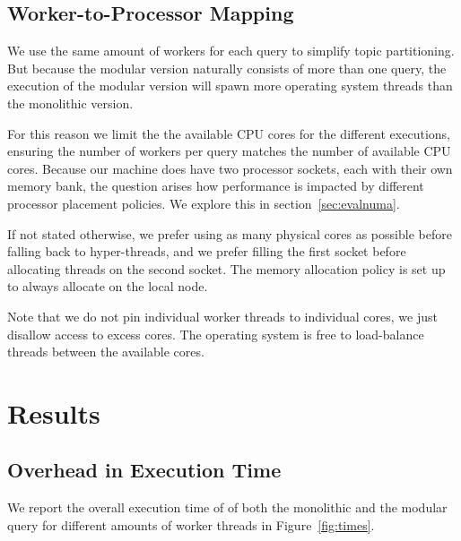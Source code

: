 \subsection{Worker-to-Processor Mapping}

We use the same amount of workers for each query to simplify topic partitioning.
But because the modular version naturally consists of more than one query,
the execution of the modular version will spawn more operating system threads
than the monolithic version.

For this reason we limit the the available CPU cores for the different executions,
ensuring the number of workers per query matches the number of available CPU cores.
Because our machine does have two processor sockets, each with their own memory bank,
the question arises how performance is impacted by different processor placement
policies. We explore this in section~\ref{sec:evalnuma}.

If not stated otherwise, we prefer using as many physical cores 
as possible before falling back to hyper-threads, and we prefer filling the
first socket before allocating threads on the second socket. The memory
allocation policy is set up to always allocate on the local node.

Note that we do not pin individual worker threads to individual cores, we just
disallow access to excess cores. The operating system is free to load-balance
threads between the available cores.

\clearpage

\section{Results}

\subsection{Overhead in Execution Time}

We report the overall execution time of of both the monolithic and the 
modular query for different amounts of worker threads in Figure~\ref{fig:times}.

